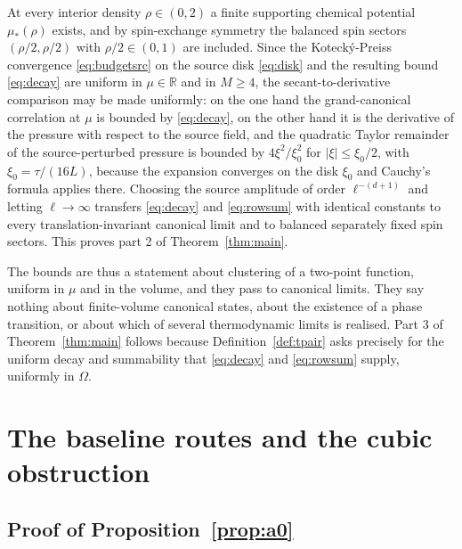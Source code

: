 \documentclass[11pt]{article}
\theoremstyle{plain}
\theoremstyle{definition}
\begin{document}
At every interior density $\rho\in(0,2)$ a finite supporting chemical potential
$\mu_*(\rho)$ exists, and by spin-exchange symmetry the balanced spin sectors
$(\rho/2,\rho/2)$ with $\rho/2\in(0,1)$ are included. Since the
Koteck\'y-Preiss convergence \eqref{eq:budgetsrc} on the source disk
\eqref{eq:disk} and the resulting bound \eqref{eq:decay} are uniform in
$\mu\in\mathbb R$ and in $M\ge4$, the secant-to-derivative comparison may be made
uniformly: on the one hand the grand-canonical correlation at $\mu$ is bounded by
\eqref{eq:decay}, on the other hand it is the derivative of the pressure with
respect to the source field, and the quadratic Taylor remainder of the \mbox{source-perturbed} pressure is bounded by $4\xi^2/\xi_0^2$ for $|\xi|\le\xi_0/2$, with
$\xi_0=\tau/(16L)$, because the expansion converges on the disk $\xi_0$ and Cauchy's
formula applies there. Choosing
the source amplitude of order $\ell^{-(d+1)}$ and letting $\ell\to\infty$ transfers
\eqref{eq:decay} and \eqref{eq:rowsum} with identical constants to every
translation-invariant canonical limit and to balanced separately fixed spin sectors.
This proves part 2 of Theorem~\ref{thm:main}.

The bounds are thus a statement about clustering of a two-point function, uniform in
$\mu$ and in the volume, and they pass to canonical limits. They say nothing about
finite-volume canonical states, about the existence of a phase transition, or about
which of several thermodynamic limits is realised. Part 3 of
Theorem~\ref{thm:main} follows because Definition~\ref{def:tpair} asks precisely for
the uniform decay and summability that \eqref{eq:decay} and \eqref{eq:rowsum}
supply, uniformly in $\Omega$.

\section{The baseline routes and the cubic obstruction}\label{sec:baselineproofs}

\subsection{Proof of Proposition~\ref{prop:a0}}
\end{document}
